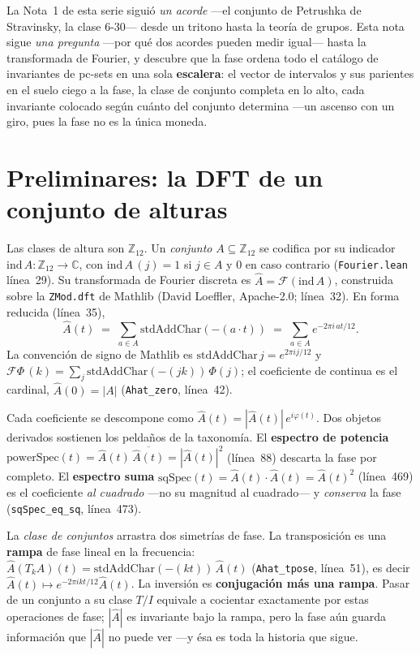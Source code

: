 \documentclass[11pt]{article}
\newcommand{\lean}[1]{\texttt{#1}}
\newcommand{\Ztwelve}{\mathbb{Z}_{12}}
\newcommand{\Ahat}{\hat{A}}
\begin{document}
La Nota~1 de esta serie siguió \emph{un acorde} ---el conjunto de Petrushka de Stravinsky, la clase
6-30--- desde un tritono hasta la teoría de grupos. Esta nota sigue \emph{una pregunta} ---por qué dos
acordes pueden medir igual--- hasta la transformada de Fourier, y descubre que la fase ordena todo el
catálogo de invariantes de pc-sets en una sola \textbf{escalera}: el vector de intervalos y sus parientes en el
suelo ciego a la fase, la clase de conjunto completa en lo alto, cada invariante colocado según cuánto del
conjunto determina ---un ascenso con un giro, pues la fase no es la única moneda.

\section{Preliminares: la DFT de un conjunto de alturas}\label{sec:setup}

Las clases de altura son $\Ztwelve$. Un \emph{conjunto} $A\subseteq\Ztwelve$ se codifica por su indicador
$\mathrm{ind}\,A:\Ztwelve\to\mathbb{C}$, con $\mathrm{ind}\,A\,(j)=1$ si $j\in A$ y $0$ en caso contrario
(\lean{Fourier.lean} línea~29). Su transformada de Fourier discreta es $\Ahat=\mathcal{F}(\mathrm{ind}\,A)$,
construida sobre la \lean{ZMod.dft} de Mathlib (David Loeffler, Apache-2.0; línea~32). En forma reducida
(línea~35),
\[
  \Ahat(t)\;=\;\sum_{a\in A}\mathrm{stdAddChar}(-(a\cdot t))\;=\;\sum_{a\in A}e^{-2\pi i\,a t/12}.
\]
La convención de signo de Mathlib es $\mathrm{stdAddChar}\,j=e^{2\pi i j/12}$ y
$\mathcal{F}\Phi\,(k)=\sum_j\mathrm{stdAddChar}(-(jk))\,\Phi(j)$; el coeficiente de continua es el
cardinal, $\Ahat(0)=|A|$ (\lean{Ahat\_zero}, línea~42).

Cada coeficiente se descompone como $\Ahat(t)=|\Ahat(t)|\,e^{i\varphi(t)}$. Dos objetos derivados
sostienen los peldaños de la taxonomía. El \textbf{espectro de potencia}
$\mathrm{powerSpec}(t)=\Ahat(t)\,\overline{\Ahat(t)}=|\Ahat(t)|^2$ (línea~88) descarta la fase por
completo. El \textbf{espectro suma} $\mathrm{sqSpec}(t)=\Ahat(t)\cdot\Ahat(t)=\Ahat(t)^2$ (línea~469) es el
coeficiente \emph{al cuadrado} ---no su magnitud al cuadrado--- y \emph{conserva} la fase
(\lean{sqSpec\_eq\_sq}, línea~473).

La \emph{clase de conjuntos} arrastra dos simetrías de fase. La transposición es una \textbf{rampa} de
fase lineal en la frecuencia: $\Ahat(T_kA)(t)=\mathrm{stdAddChar}(-(kt))\,\Ahat(t)$ (\lean{Ahat\_tpose},
línea~51), es decir $\Ahat(t)\mapsto e^{-2\pi i k t/12}\Ahat(t)$. La inversión es \textbf{conjugación más
una rampa}. Pasar de un conjunto a su clase $T/I$ equivale a cocientar exactamente por estas operaciones
de fase; $|\Ahat|$ es invariante bajo la rampa, pero la fase aún guarda información que $|\Ahat|$ no puede
ver ---y ésa es toda la historia que sigue.
\end{document}
